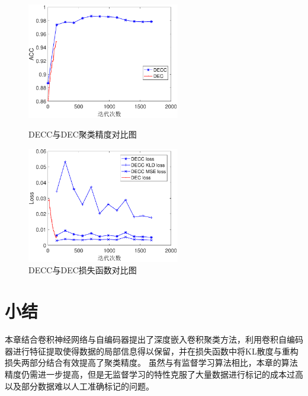 \begin{figure}[hbt]
	\centering
	\begin{minipage}{7cm}
		\includegraphics[width=6.67cm]{figures/ae/unsurpvised_acc}
    \caption{DECC与DEC聚类精度对比图}
    \label{fig:unsurpvised_acc}

	\end{minipage}
	\hspace{10pt}
	\begin{minipage}{7cm}
		\includegraphics[width=6.67cm]{figures/ae/unsurpvised_loss}
    \caption{DECC与DEC损失函数对比图}
    \label{fig:unsurpvised_loss}

	\end{minipage}

\end{figure}

\section{小结}
\label{sec:decc_summary}
本章结合卷积神经网络与自编码器提出了深度嵌入卷积聚类方法，利用卷积自编码器进行特征提取使得数据的局部信息得以保留，并在损失函数中将KL散度与重构损失两部分结合有效提高了聚类精度。
虽然与有监督学习算法相比，本章的算法精度仍需进一步提高，但是无监督学习的特性克服了大量数据进行标记的成本过高以及部分数据难以人工准确标记的问题。
